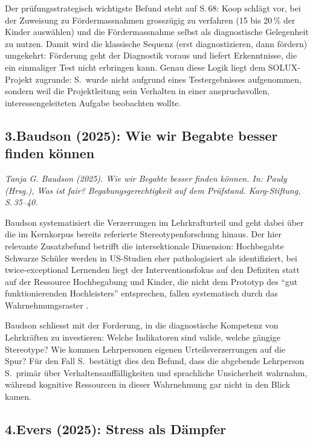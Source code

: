 \documentclass[ngerman, a4paper]{article}
\begin{document}
Der prüfungsstrategisch wichtigste Befund steht auf S.\,68: Koop schlägt vor,
bei der Zuweisung zu Fördermassnahmen grosszügig zu verfahren (15 bis 20\,\%
der Kinder auswählen) und die Fördermassnahme selbst als diagnostische
Gelegenheit zu nutzen. Damit wird die klassische Sequenz (erst diagnostizieren,
dann fördern) umgekehrt: Förderung geht der Diagnostik voraus und liefert
Erkenntnisse, die ein einmaliger Test nicht erbringen kann. Genau diese Logik
liegt dem SOLUX-Projekt zugrunde: S.\ wurde nicht aufgrund eines
Testergebnisses aufgenommen, sondern weil die Projektleitung sein Verhalten in
einer anspruchsvollen, interessengeleiteten Aufgabe beobachten wollte.


\subsection*{3.\quad Baudson (2025): Wie wir Begabte besser finden können}

\textit{Tanja G. Baudson (2025). Wie wir Begabte besser finden können.
  In: Pauly (Hrsg.), Was ist fair? Begabungsgerechtigkeit auf dem Prüfstand.
  Karg-Stiftung, S.\,35--40.}

\medskip
Baudson systematisiert die Verzerrungen im Lehrkrafturteil und geht dabei über
die im Kernkorpus bereits referierte Stereotypenforschung
\parencite[S.\,115--120]{baudson2021wasdenken} hinaus. Der hier relevante
Zusatzbefund betrifft die intersektionale Dimension: Hochbegabte Schwarze
Schüler werden in US-Studien eher pathologisiert als identifiziert, bei
twice-exceptional Lernenden liegt der Interventionsfokus auf den Defiziten statt
auf der Ressource Hochbegabung und Kinder, die nicht dem Prototyp des
\enquote{gut funktionierenden Hochleisters} entsprechen, fallen systematisch
durch das Wahrnehmungsraster
\parencite[S.\,38--39]{baudson2025besserfinden}.

Baudson schliesst mit der Forderung, in die diagnostische Kompetenz von
Lehrkräften zu investieren: Welche Indikatoren sind valide, welche gängige
Stereotype? Wie kommen Lehrpersonen eigenen Urteilsverzerrungen auf die Spur?
Für den Fall S.\ bestätigt dies den Befund, dass die abgebende Lehrperson S.\
primär über Verhaltensauffälligkeiten und sprachliche Unsicherheit wahrnahm, während
kognitive Ressourcen in dieser Wahrnehmung gar nicht in den Blick kamen.


\subsection*{4.\quad Evers (2025): Stress als Dämpfer}
\end{document}
